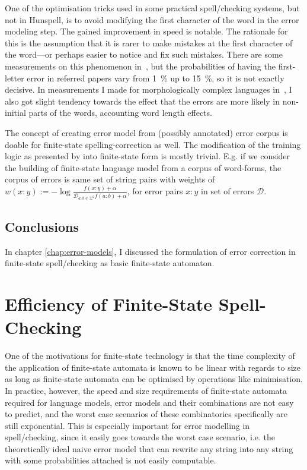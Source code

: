 \documentclass[officiallayout]{unihelcompling}
\begin{document}
One of the optimisation tricks used in some practical spell\-/checking systems,
but not in Hunspell, is to avoid modifying the first character of the word in
the error modeling step. The gained improvement in speed is notable. The
rationale for this is the assumption that it is rarer to make mistakes at the
first character of the word---or perhaps easier to notice and fix such
mistakes. There are some measurements on this phenomenon
in~\citet{bhagat2007spelling}, but the probabilities of having the first-letter
error in referred papers vary from 1~\% up to 15~\%, so it is not
exactly decisive. In measurements I made for morphologically complex languages
in~, I also got slight tendency towards the
effect that the errors are more likely in non-initial parts of the words,
accounting word length effects.

The concept of creating error model from (possibly annotated) error corpus is
doable for finite-state spelling-correction as well. The modification of the
training logic as presented by \citep{church1991probability} into finite-state
form is mostly trivial. E.g. if we consider the building of finite-state
language model from a corpus of word-forms, the corpus of errors is same set of
string pairs with weights of $w(x:y) := -\log\frac{f(x:y) +
\alpha}{\mathcal{D}_{a:b \in \Sigma^2} f(a:b) + \alpha}$, for error pairs $x:y$
in set of errors $\mathcal{D}$.

\section{Conclusions}

In chapter \ref{chap:error-models}, I discussed the formulation of error
correction in finite-state spell\-/checking as basic finite-state automaton. 

\chapter{Efficiency of Finite-State Spell-Checking}
\label{chap:efficiency}

One of the motivations for finite-state technology is that the time complexity
of the application of finite-state automata is known to be linear with regards
to size as long as finite-state automata can be optimised by operations like
minimisation. In practice, however, the speed and size requirements of
finite-state automata required for language models, error models and their
combinations are not easy to predict, and the worst case scenarios of these
combinatorics specifically are still exponential. This is especially important
for error modelling in spell\-/checking, since it easily goes towards the worst
case scenario, i.e. the theoretically ideal naive error model that can rewrite
any string into any string with some probabilities attached is not easily
computable.
\end{document}
